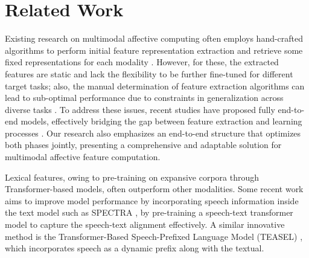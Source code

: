 \documentclass[11pt]{article}
\begin{document}
\section{Related Work}
Existing research on multimodal affective computing often employs hand-crafted algorithms to perform initial feature representation extraction and retrieve some fixed representations for each modality \cite{Shenoy_2020}. \cite{delbrouck-etal-2020-transformer} However, for these, the extracted features are static and lack the flexibility to be further fine-tuned for different target tasks; also, the manual determination of feature extraction algorithms can lead to sub-optimal performance due to constraints in generalization across diverse tasks \cite{dai-etal-2021-multimodal}. 
To address these issues, recent studies have proposed fully end-to-end models, effectively bridging the gap between feature extraction and learning processes \cite{dai-etal-2021-multimodal} \cite{10.1145/3366423.3380000}. Our research also emphasizes an end-to-end structure that optimizes both phases jointly, presenting a comprehensive and adaptable solution for multimodal affective feature computation.

Lexical features, owing to pre-training on expansive corpora through Transformer-based models, often outperform other modalities. Some recent work aims to improve model performance by incorporating speech information inside the text model such as SPECTRA \cite{yu2023speechtext}, by pre-training a speech-text transformer model to capture the speech-text alignment effectively.  A similar innovative method is the Transformer-Based Speech-Prefixed Language Model (TEASEL) \cite{arjmand2021teasel}, which incorporates speech as a dynamic prefix along with the textual.
\end{document}
